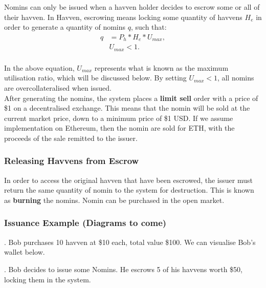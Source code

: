\noindent Nomins can only be issued when a havven holder decides to escrow some or all of their havven. In Havven, escrowing means locking some quantity of havvens $ H_e $ in order to generate a quantity of nomins $q$, such that:
\begin{align*}
q &= P_h * H_e * U_{max}, \\
& U_{max} < 1. \\
\end{align*}

\noindent In the above equation, $U_{max}$ represents what is known as the maximum utilisation ratio, which will be discussed below. By setting $U_{max} < 1 $, all nomins are overcollateralised when issued. \\

\noindent After generating the nomins, the system places a \textbf{limit sell} order with a price of \$1 on a decentralised exchange. This means that the nomin will be sold at the current market price, down to a minimum price of \$1 USD. If we assume implementation on Ethereum, then the nomin are sold for ETH, with the proceeds of the sale remitted to the issuer. \\

\subsubsection{Releasing Havvens from Escrow}

\noindent In order to access the original havven that have been escrowed, the issuer must return the same quantity of nomin to the system for destruction. This is known as \textbf{burning} the nomins. Nomin can be purchased in the open market.

\newpage

\subsubsection{Issuance Example (Diagrams to come)}

. Bob purchases 10 havven at \$10 each, total value \$100. We can visualise Bob's wallet below.

\begin{center}
\end{center}

. Bob decides to issue some Nomins. He escrows 5 of his havvens worth \$50, locking them in the system. \\

